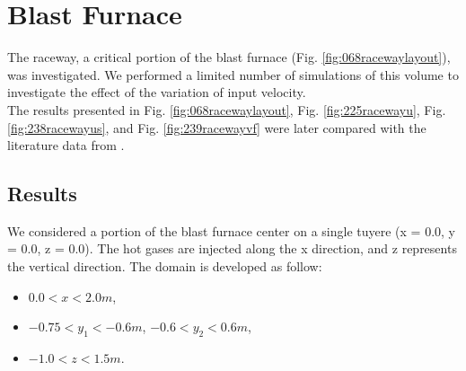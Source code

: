 
\chapter{Blast Furnace}
\label{cap:blastfurnace}


The raceway, a critical portion of the blast furnace (Fig.
\ref{fig:068racewaylayout}), was investigated.
We performed a limited number of simulations of this volume to investigate the
effect of the variation of input velocity.\\
The results presented in Fig. \ref{fig:068racewaylayout}, Fig.
\ref{fig:225racewayu}, Fig. \ref{fig:238racewayus}, and Fig.
\ref{fig:239racewayvf} were later compared with the literature data from
\citet{RefWorks:208}.



\newpage

\section{Results}
\label{sec:resultsbf}

We considered a portion of the blast furnace center on a single tuyere (x = 0.0,
y = 0.0, z = 0.0).
The hot gases are injected along the x direction, and z represents the vertical
direction.
The domain is developed as follow:
\begin{itemize}
  \item{$0.0 < x < 2.0 m$,}
  \item{$-0.75 < y_1 < -0.6 m$, $-0.6 < y_2 < 0.6 m$,}
  \item{$-1.0 < z < 1.5 m$.} 
\end{itemize}

